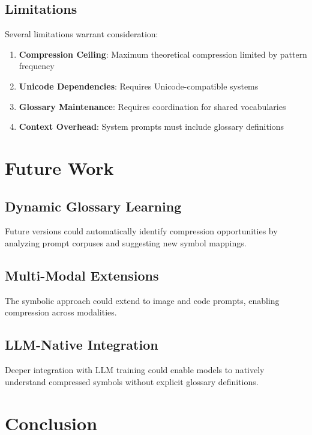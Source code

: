 \documentclass[11pt,twocolumn]{article}
\begin{document}
\subsection{Limitations}

Several limitations warrant consideration:

\begin{enumerate}
\item \textbf{Compression Ceiling}: Maximum theoretical compression limited by pattern frequency
\item \textbf{Unicode Dependencies}: Requires Unicode-compatible systems
\item \textbf{Glossary Maintenance}: Requires coordination for shared vocabularies
\item \textbf{Context Overhead}: System prompts must include glossary definitions
\end{enumerate}

\section{Future Work}

\subsection{Dynamic Glossary Learning}

Future versions could automatically identify compression opportunities by analyzing prompt corpuses and suggesting new symbol mappings.

\subsection{Multi-Modal Extensions}

The symbolic approach could extend to image and code prompts, enabling compression across modalities.

\subsection{LLM-Native Integration}

Deeper integration with LLM training could enable models to natively understand compressed symbols without explicit glossary definitions.

\section{Conclusion}
\end{document}

